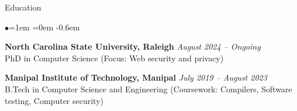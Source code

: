 \documentclass{resume} %
\date{\today}
\begin{document}
\begin{rSection}{Education}
\begin{list}{$\bullet$}{\leftmargin=1em \itemindent=0em}
\itemsep -0.6em
\item {\bf North Carolina State University, Raleigh} \hfill {\em August 2024 -- Ongoing}  \\ PhD in Computer Science (Focus: Web security and privacy)\hfill
\item {\bf Manipal Institute of Technology, Manipal} \hfill {\em July 2019 -- August 2023}  \\ B.Tech in Computer Science and Engineering (Coursework: Compilers, Software testing, Computer security)\hfill
\end{list}
\end{rSection}
\printbibliography[heading=none]
\end{document}

